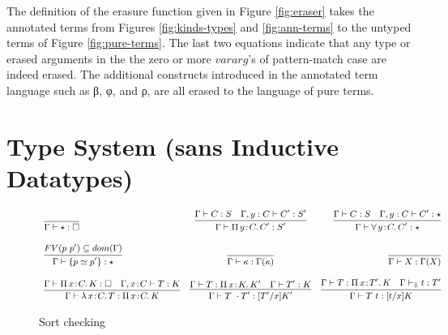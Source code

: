 \documentclass{article}
\newcommand{\ann}[2]{#1\! : \! #2}
\newcommand{\abs}[4]{{#1}\, #2\! : \! #3.\, #4}
\newcommand{\decchk}{\vdash_{\Downarrow}}
\begin{document}
The definition of the erasure function given in Figure \ref{fig:eraser} takes
the annotated terms from Figures \ref{fig:kinds-types} and \ref{fig:ann-terms} to
the untyped terms of Figure \ref{fig:pure-terms}. The last two equations
indicate that any type or erased arguments in the the zero or more $vararg$'s of
pattern-match case are indeed erased. The additional constructs introduced in
the annotated term language such as β, φ, and ρ, are all erased to the language
of pure terms.

\section{Type System (sans Inductive Datatypes)}
\label{sec:type-system}

\begin{figure}[h]
  \[ \small
    \begin{array}{lcr}
      \infer{\Gamma\vdash \star : \Box}{\ }
      & \infer
        { \Gamma\vdash\abs{\Pi}{y}{C}{C'} : S'}
        { \Gamma \vdash C : S
        \quad
        \Gamma,y:C\vdash C' : S'
        }
      & \infer
        {\Gamma\vdash\abs{\forall}{y}{C}{C'} : \star}
        {\Gamma \vdash C : S
        \quad \Gamma,y:C\vdash C' : \star
        }
      \\
      \\ \infer
      { \Gamma \vdash \{p \simeq p' \} : \star}
      { FV(p\ p') \subseteq dom(\Gamma) }
      & \infer
        { \Gamma \vdash \kappa : \Gamma(\kappa)}
        { }
      & \infer
        { \Gamma \vdash X : \Gamma(X)}
        { }
      \\
      \\ \infer
      { \Gamma \vdash \abs{\lambda}{x}{C}{T} : \abs{\Pi}{x}{C}{K}}
      { \Gamma \vdash \abs{\Pi}{x}{C}{K} : \square
      \quad \Gamma, \ann{x}{C} \vdash T : K
      }
      & \infer
        { \Gamma \vdash T\ \cdot T' : [T'/x] K'}
        { \Gamma \vdash T : \abs{\Pi}{x}{K}{K'}
        \quad \Gamma \vdash T' : K}
      & \infer
       { \Gamma \vdash T\ t : [t/x] K}
        { \Gamma \vdash T : \abs{\Pi}{x}{T'}{K}
        \quad \Gamma \decchk t : T' }
    \end{array}
  \]
  \caption{Sort checking }
  \label{fig:sort-checking}
\end{figure}
\end{document}

